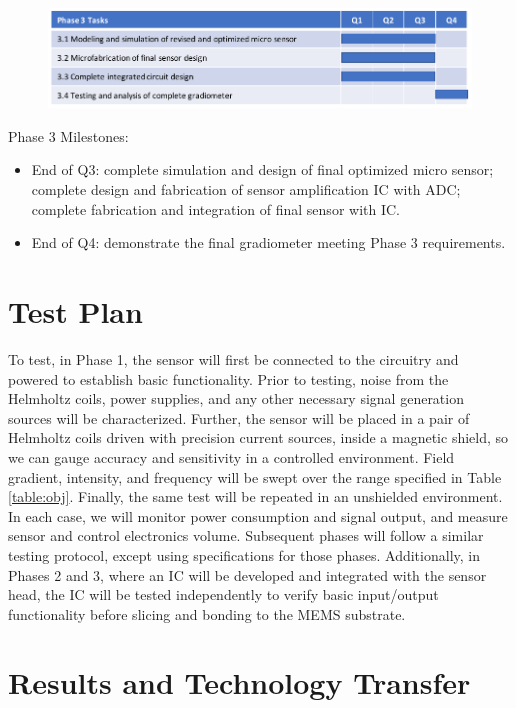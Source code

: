 \begin{figure}[H]
\centering
\includegraphics[width=\textwidth]{Gantt3}
\label{fig:gantt3}
\end{figure}
Phase 3 Milestones:
\begin{itemize}
\item End of Q3: complete simulation and design of final optimized micro sensor; complete design and fabrication of
sensor amplification IC with ADC; complete fabrication and integration of final sensor with IC.
\item End of Q4: demonstrate the final gradiometer meeting Phase 3 requirements.
\end{itemize}

\section{Test Plan}\label{sec:test}

To test, in Phase 1, the sensor will first be connected to the circuitry and powered to establish basic functionality.  Prior to testing, noise from the Helmholtz coils, power supplies, and any other necessary signal generation sources will be characterized. Further, the sensor will be placed in a pair of Helmholtz coils driven with precision current sources, inside a magnetic shield, so we can gauge accuracy and sensitivity in a controlled environment. Field gradient, intensity, and frequency will be swept over the range specified in Table \ref{table:obj}. Finally, the same test will be repeated in an unshielded environment. In each case, we will monitor power consumption and signal output, and measure sensor and control electronics volume. Subsequent phases will follow a similar testing protocol, except using specifications for those phases. Additionally, in Phases 2 and 3, where an IC will be developed and integrated with the sensor head, the IC will be tested independently to verify basic input/output functionality before slicing and bonding to the MEMS substrate.

\section{Results and Technology Transfer}

